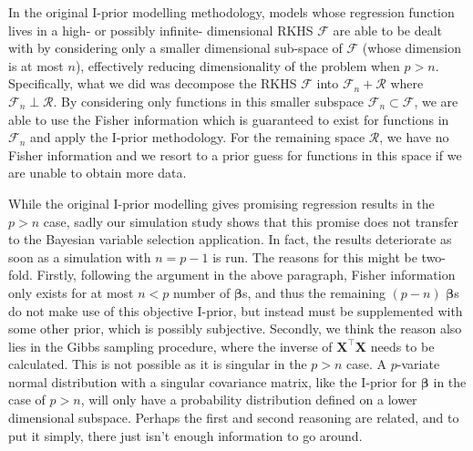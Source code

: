 In the original I-prior modelling methodology, models whose regression function lives in a high- or possibly infinite- dimensional RKHS $\mathcal F$ are able to be dealt with by considering only a smaller dimensional sub-space of $\mathcal F$ (whose dimension is at most $n$), effectively reducing dimensionality of the problem when $p>n$. Specifically, what we did was decompose the RKHS $\mathcal F$ into $\mathcal F_n + \mathcal R$ where $\mathcal F_n \perp \mathcal R$. By considering only functions in this smaller subspace $\mathcal F_n \subset \mathcal F$, we are able to use the Fisher information which is guaranteed to exist for functions in $\mathcal F_n$ and apply the I-prior methodology. For the remaining space $\mathcal R$, we have no Fisher information and we resort to a prior guess for functions in this space if we are unable to obtain more data.

While the original I-prior modelling gives promising regression results in the $p>n$ case, sadly our simulation study shows that this promise does not transfer to the Bayesian variable selection application. In fact, the results deteriorate as soon as a simulation with $n=p-1$ is run. The reasons for this might be two-fold. Firstly, following the argument in the above paragraph, Fisher information only exists for at most $n < p$ number of $\boldsymbol{\beta}$s, and thus the remaining $(p-n)$ $\boldsymbol{\beta}$s do not make use of this objective I-prior, but instead must be supplemented with some other prior, which is possibly subjective. Secondly, we think the reason also lies in the Gibbs sampling procedure, where the inverse of $\mathbf X^\top\mathbf X$ needs to be calculated. This is not possible as it is singular in the $p>n$ case. A $p$-variate normal distribution with a singular covariance matrix, like the I-prior for $\boldsymbol{\beta}$ in the case of $p>n$, will only have a probability distribution defined on a lower dimensional subspace. Perhaps the first and second reasoning are related, and to put it simply, there just isn't enough information to go around.

